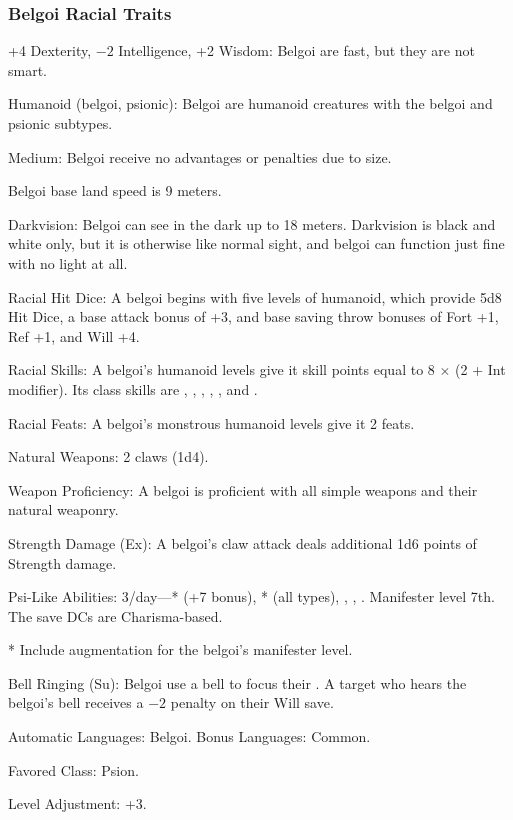 \subsubsection{Belgoi Racial Traits}
\begin{itemize*}
	\item +4 Dexterity, $-2$ Intelligence, +2 Wisdom: Belgoi are fast, but they are not smart.
    \item Humanoid (belgoi, psionic): Belgoi are humanoid creatures with the belgoi and psionic subtypes.
	\item Medium: Belgoi receive no advantages or penalties due to size.
    \item Belgoi base land speed is 9 meters.
    \item Darkvision: Belgoi can see in the dark up to 18 meters. Darkvision is black and white only, but it is otherwise like normal sight, and belgoi can function just fine with no light at all.
    \item Racial Hit Dice: A belgoi begins with five levels of humanoid, which provide 5d8 Hit Dice, a base attack bonus of +3, and base saving throw bonuses of Fort +1, Ref +1, and Will +4.
    \item Racial Skills: A belgoi's humanoid levels give it skill points equal to 8 $\times$ (2 + Int modifier). Its class skills are , , , , , and .
    \item Racial Feats: A belgoi's monstrous humanoid levels give it 2 feats.
    \item Natural Weapons: 2 claws (1d4).
    \item Weapon Proficiency: A belgoi is proficient with all simple weapons and their natural weaponry.
    \item Strength Damage (Ex): A belgoi's claw attack deals additional 1d6 points of Strength damage.
    \item Psi-Like Abilities: 3/day---* (+7 bonus), * (all types), , , . Manifester level 7th. The save DCs are Charisma-based.

    * Include augmentation for the belgoi's manifester level.
    \item Bell Ringing (Su): Belgoi use a bell to focus their . A  target who hears the belgoi's bell receives a $-2$ penalty on their Will save.
    \item Automatic Languages: Belgoi. Bonus Languages: Common.
    \item Favored Class: Psion.
    \item Level Adjustment: +3.
\end{itemize*}
